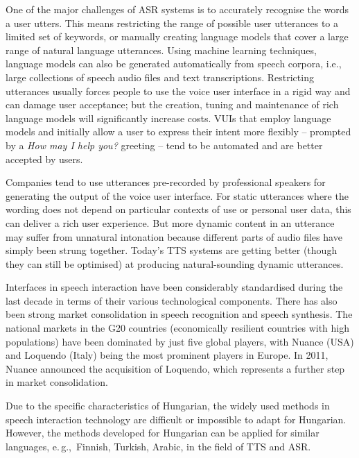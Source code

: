 \begin{multicols}{2}
One of the major challenges of ASR systems is to accurately recognise the words a user utters. This means restricting the range of possible user utterances to a limited set of keywords, or manually creating language models that cover a large range of natural language utterances. Using machine learning techniques, language models can also be generated automatically from speech corpora, i.e., large collections of speech audio files and text transcriptions. Restricting utterances usually forces people to use the voice user interface in a rigid way and can damage user acceptance; but the creation, tuning and maintenance of rich language models will significantly increase costs. VUIs that employ language models and initially allow a user to express their intent more flexibly -- prompted by a \textit{How may I help you?} greeting -- tend to be automated and are better accepted by users.

Companies tend to use utterances pre-recorded by professional speakers for generating the output of the voice user interface. For static utterances where the wording does not depend on particular contexts of use or personal user data, this can deliver a rich user experience. But more dynamic content in an utterance may suffer from unnatural intonation because different parts of audio files have simply been strung together. Today's TTS systems are getting better (though they can still be optimised) at producing natural-sounding dynamic utterances. 

Interfaces in speech interaction have been considerably standardised during the last decade in terms of their various technological components. There has also been strong market consolidation in speech recognition and speech synthesis. The national markets in the G20 countries (economically resilient countries with high populations) have been dominated by just five global players, with Nuance (USA) and Loquendo (Italy) being the most prominent players in Europe. In 2011, Nuance announced the acquisition of Loquendo, which represents a further step in market consolidation.

Due to the specific characteristics of Hungarian, the widely used methods in speech interaction technology are difficult or impossible to adapt for Hungarian. However, the methods developed for Hungarian can be applied for similar languages, e.\,g.,~Finnish, Turkish, Arabic, in the field of TTS and ASR. 


\end{multicols}
